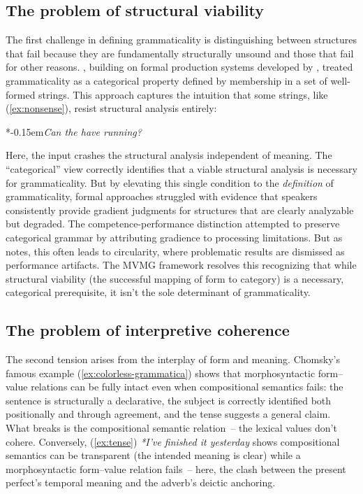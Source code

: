 \documentclass[12pt,letterpaper]{article}
\newcommand{\mention}[1]{\textit{#1}}
\newcommand{\judgesep}{\kern-0.15em}
\newcommand{\ungram}[1]{*\judgesep#1}
\begin{document}
\subsection{The problem of structural viability}\label{sec:impasse-viability}

The first challenge in defining grammaticality is distinguishing between structures that fail because they are fundamentally structurally unsound and those that fail for other reasons. \textcite{chomsky1957}, building on formal production systems developed by \textcite{post1943}, treated grammaticality as a categorical property defined by membership in a set of well-formed strings. This approach captures the intuition that some strings, like (\ref{ex:nonsense}), resist structural analysis entirely:

\ea
\ungram{\mention{Can the have running?}}
\z

Here, the input crashes the structural analysis independent of meaning. The \enquote{categorical} view correctly identifies that a viable structural analysis is necessary for grammaticality. But by elevating this single condition to the \emph{definition} of grammaticality, formal approaches struggled with evidence that speakers consistently provide gradient judgments for structures that are clearly analyzable but degraded. The competence-performance distinction \autocite{chomsky1965} attempted to preserve categorical grammar by attributing gradience to processing limitations. But as \textcite[71]{schutze2016} notes, this often leads to circularity, where problematic results are dismissed as performance artifacts. The MVMG framework resolves this recognizing that while structural viability (the successful mapping of form to category) is a necessary, categorical prerequisite, it isn't the sole determinant of grammaticality.

\subsection{The problem of interpretive coherence}\label{sec:impasse-coherence}

The second tension arises from the interplay of form and meaning. Chomsky's famous example (\ref{ex:colorless-grammatica}) shows that morphosyntactic form--value relations can be fully intact even when compositional semantics fails: the sentence is structurally a declarative, the subject is correctly identified both positionally and through agreement, and the tense suggests a general claim. What breaks is the compositional semantic relation~-- the lexical values don't cohere. Conversely, (\ref{ex:tense}) \textit{*I've finished it yesterday} shows compositional semantics can be transparent (the intended meaning is clear) while a morphosyntactic form--value relation fails~-- here, the clash between the present perfect's temporal meaning and the adverb's deictic anchoring.
\end{document}
